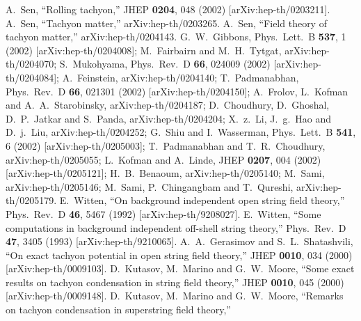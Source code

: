 \documentclass[12pt,a4paper]{article}
\begin{document}
\begin{thebibliography}{99}
A.~Sen,
``Rolling tachyon,''
JHEP {\bf 0204}, 048 (2002)
[arXiv:hep-th/0203211].
A.~Sen,
``Tachyon matter,''
arXiv:hep-th/0203265.
A.~Sen,
``Field theory of tachyon matter,''
arXiv:hep-th/0204143.
G.~W.~Gibbons,
Phys.\ Lett.\ B {\bf 537}, 1 (2002)
[arXiv:hep-th/0204008];
M.~Fairbairn and M.~H.~Tytgat,
arXiv:hep-th/0204070;
S.~Mukohyama,
Phys.\ Rev.\ D {\bf 66}, 024009 (2002)
[arXiv:hep-th/0204084];
A.~Feinstein,
arXiv:hep-th/0204140;
T.~Padmanabhan,
Phys.\ Rev.\ D {\bf 66}, 021301 (2002)
[arXiv:hep-th/0204150];
A.~Frolov, L.~Kofman and A.~A.~Starobinsky,
arXiv:hep-th/0204187;
D.~Choudhury, D.~Ghoshal, D.~P.~Jatkar and S.~Panda,
arXiv:hep-th/0204204;
X.~z.~Li, J.~g.~Hao and D.~j.~Liu,
arXiv:hep-th/0204252;
G.~Shiu and I.~Wasserman,
Phys.\ Lett.\ B {\bf 541}, 6 (2002)
[arXiv:hep-th/0205003];
T.~Padmanabhan and T.~R.~Choudhury,
arXiv:hep-th/0205055;
L.~Kofman and A.~Linde,
JHEP {\bf 0207}, 004 (2002)
[arXiv:hep-th/0205121];
H.~B.~Benaoum,
arXiv:hep-th/0205140;
M.~Sami,
arXiv:hep-th/0205146;
M.~Sami, P.~Chingangbam and T.~Qureshi,
arXiv:hep-th/0205179.
E.~Witten,
``On background independent open string field theory,''
Phys.\ Rev.\ D {\bf 46}, 5467 (1992)
[arXiv:hep-th/9208027].
E.~Witten,
``Some computations in background independent off-shell string theory,''
Phys.\ Rev.\ D {\bf 47}, 3405 (1993)
[arXiv:hep-th/9210065].
A.~A.~Gerasimov and S.~L.~Shatashvili,
``On exact tachyon potential in open string field theory,''
JHEP {\bf 0010}, 034 (2000)
[arXiv:hep-th/0009103].
D.~Kutasov, M.~Marino and G.~W.~Moore,
``Some exact results on tachyon condensation in string field theory,''
JHEP {\bf 0010}, 045 (2000)
[arXiv:hep-th/0009148].
D.~Kutasov, M.~Marino and G.~W.~Moore,
``Remarks on tachyon condensation in superstring field theory,''

\end{thebibliography}
\end{document}
